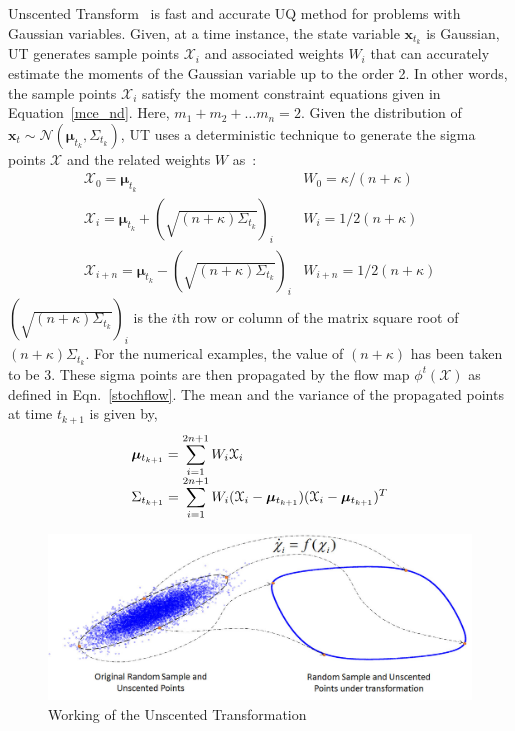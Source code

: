 Unscented Transform~\cite{julier1997new} is fast and accurate UQ method for problems with Gaussian variables. Given, at a time instance, the state variable $\mathbf{x}_{t_k}$ is Gaussian, UT generates sample points $\mathcal{X}_i$ and associated weights $W_i$ that can accurately estimate the moments of the Gaussian variable up to the order 2. In other words, the sample points $\mathcal{X}_i$ satisfy the moment constraint equations given in Equation~\ref{mce_nd}. Here, $m_1 + m_2 + \ldots m_n = 2$. Given the distribution of $\textbf{x}_t \sim \mathcal{N}(\bm{\mu}_{t_k},\Sigma_{t_k})$, UT uses a deterministic technique to generate the sigma points $\mathcal{X}$ and the related weights $W$ as~\cite{julier1997new}:
\begin{equation}
\label{sigmapt}
\begin{array}{lr}
\mathcal{X}_0 = \bm{\mu}_{t_k} &W_0 = \kappa /(n+ \kappa)  \\
\mathcal{X}_i = \bm{\mu}_{t_k} + \left( \sqrt{(n+ \kappa) \Sigma_{t_k}} \right)_i  &W_i = 1 /2(n+ \kappa)  \\
\mathcal{X}_{i+n} = \bm{\mu}_{t_k} - \left( \sqrt{(n+ \kappa) \Sigma_{t_k}} \right)_i  &W_{i+n} = 1 /2(n+ \kappa)
\end{array}
\end{equation}
$\left( \sqrt{(n+ \kappa) \Sigma_{t_k}} \right)_i$ is the $i$th row or column of the matrix square root of $(n+ \kappa) \Sigma_{t_k}$. For the numerical examples, the value of $(n+\kappa)$  has been taken to be 3. These sigma points are then propagated by the flow map $\phi^t(\mathcal{X})$ as defined in Eqn.~\ref{stochflow}. The mean and the variance of the propagated points at time $t_{k+1}$ is given by,
\begin{equation}
\label{prop}
\begin{array}{l}
\bm{\mu}_{t_{k+1}} =  \displaystyle \sum_{i=1}^{2n+1} W_i \mathcal{X}_i   \\
\Sigma_{t_{k+1}} = \displaystyle \sum_{i=1}^{2n+1} W_i (\mathcal{X}_i - \bm{\mu}_{t_{k+1}})(\mathcal{X}_i - \bm{\mu}_{t_{k+1}})^T  \notag
\end{array}
\end{equation}
\begin{figure}[H]
\centering
\includegraphics[width=\textwidth]{figures/FIG_9}
\caption{Working of the Unscented Transformation}
\label{UnscT}
\end{figure}

